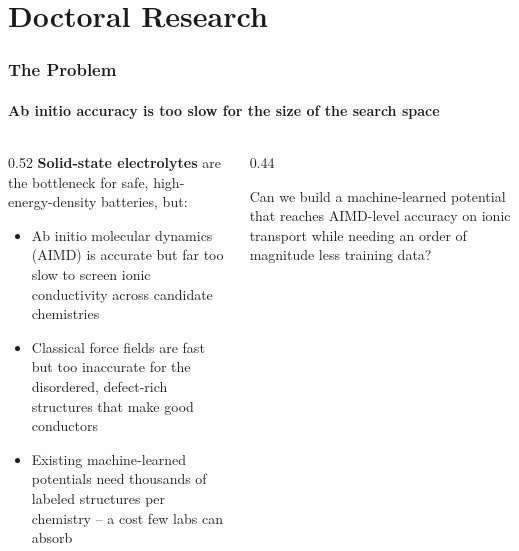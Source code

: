 \section{Doctoral Research}

\begin{frame}
\frametitle{The Problem}
\framesubtitle{Ab initio accuracy is too slow for the size of the search space}

\begin{columns}[T]
\begin{column}{0.52\linewidth}
\textbf{Solid-state electrolytes} are the bottleneck for safe, high-energy-density batteries, but:
\begin{itemize}
  \item Ab initio molecular dynamics (AIMD) is accurate but far too slow to screen ionic conductivity across candidate chemistries
  \item Classical force fields are fast but too inaccurate for the disordered, defect-rich structures that make good conductors
  \item Existing machine-learned potentials need thousands of labeled structures per chemistry -- a cost few labs can absorb
\end{itemize}
\end{column}
\begin{column}{0.44\linewidth}
\begin{tcolorbox}[colback=primary!6,colframe=primary,title={\small Research Question},fonttitle=\bfseries,coltitle=white]
\small Can we build a machine-learned potential that reaches AIMD-level accuracy on ionic transport while needing an order of magnitude less training data?
\end{tcolorbox}
\end{column}
\end{columns}
\end{frame}

